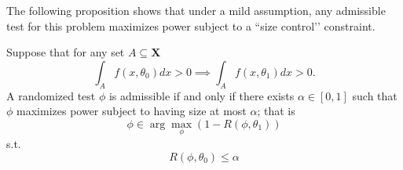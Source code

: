 \documentclass[11pt]{article} %
\begin{document}
The following proposition shows that under a mild assumption, any admissible test for this problem maximizes power subject to a ``size control’’ constraint. 

\begin{proposition} Suppose that for any set $A \subseteq \mathbf{X}$
$$\int_{A} f(x,\theta_0)dx > 0 \implies \int_{A} f(x,\theta_1)dx > 0 .$$ 
A randomized test $\phi$ is admissible if and only if there exists $\alpha \in [0,1]$ such that $\phi$ maximizes power subject to having size at most $\alpha$; that is
\begin{equation}
\phi \in \arg \max_{\phi} \left( 1-R(\phi, \theta_1) \right) \label{equation:optimization}
\end{equation}
\noindent s.t.
\begin{equation}
R(\phi, \theta_0) \leq \alpha \label{equation:sizecontrol}
\end{equation}
\end{proposition}
\end{document}
